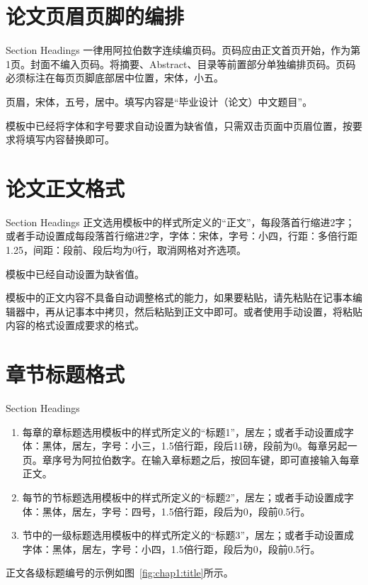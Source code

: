 \section{论文页眉页脚的编排}{Section Headings}
一律用阿拉伯数字连续编页码。页码应由正文首页开始，作为第1页。封面不编入页码。将摘要、Abstract、目录等前置部分单独编排页码。页码必须标注在每页页脚底部居中位置，宋体，小五。

页眉，宋体，五号，居中。填写内容是“毕业设计（论文）中文题目”。

模板中已经将字体和字号要求自动设置为缺省值，只需双击页面中页眉位置，按要求将填写内容替换即可。

\section{论文正文格式}{Section Headings}
正文选用模板中的样式所定义的“正文”，每段落首行缩进2字；或者手动设置成每段落首行缩进2字，字体：宋体，字号：小四，行距：多倍行距 1.25，间距：段前、段后均为0行，取消网格对齐选项。

模板中已经自动设置为缺省值。

模板中的正文内容不具备自动调整格式的能力，如果要粘贴，请先粘贴在记事本编辑器中，再从记事本中拷贝，然后粘贴到正文中即可。或者使用手动设置，将粘贴内容的格式设置成要求的格式。

\section{章节标题格式}{Section Headings}
\begin{enumerate}[(1)]
	\item 每章的章标题选用模板中的样式所定义的“标题1”，居左；或者手动设置成字体：黑体，居左，字号：小三，1.5倍行距，段后11磅，段前为0。每章另起一页。章序号为阿拉伯数字。在输入章标题之后，按回车键，即可直接输入每章正文。
	\item 每节的节标题选用模板中的样式所定义的“标题2”，居左；或者手动设置成字体：黑体，居左，字号：四号，1.5倍行距，段后为0，段前0.5行。
	
	\item 节中的一级标题选用模板中的样式所定义的“标题3”，居左；或者手动设置成字体：黑体，居左，字号：小四，1.5倍行距，段后为0，段前0.5行。
\end{enumerate}

正文各级标题编号的示例如图~\ref{fig:chap1:title}所示。

